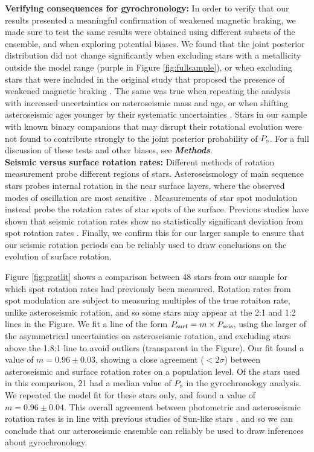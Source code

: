 \documentclass[12pt]{article}
\begin{document}
\textbf{Verifying consequences for gyrochronology:} In order to verify that our results presented a meaningful confirmation of weakened magnetic braking, we made sure to test the same results were obtained using different subsets of the ensemble, and when exploring potential biases. We found that the joint posterior distribution did not change significantly when excluding stars with a metallicity outside the model range (purple in Figure \ref{fig:fullsample}), or when excluding stars that were included in the original study that proposed the presence of weakened magnetic braking \cite{vansaders+2016}. The same was true when repeating the analysis with increased uncertainties on asteroseismic mass and age, or when shifting asteroseismic ages younger by their systematic uncertainties \cite{silvaaguirre+2015, silvaaguirre+2017}. Stars in our sample with known binary companions that may disrupt their rotational evolution were not found to contribute strongly to the joint posterior probability of $P_{\rm s}$. For a full discussion of these tests and other biases, see \textbf{\textit{Methods}}.\\

\textbf{Seismic versus surface rotation rates:} Different methods of rotation measurement probe different regions of stars. Asteroseismology of main sequence stars probes internal rotation in the near surface layers, where the observed modes of oscillation are most sensitive \cite{lund+2014}. Measurements of star spot modulation instead probe the rotation rates of star spots of the surface. Previous studies have shown that seismic rotation rates show no statistically significant deviation from spot rotation rates \cite{nielsen+2015, benomar+2015}. Finally, we confirm this for our larger sample to ensure that our seismic rotation periods can be reliably used to draw conclusions on the evolution of surface rotation.

Figure \ref{fig:protlit} shows a comparison between 48 stars from our sample for which spot  rotation rates had previously been measured. Rotation rates from spot modulation are subject to measuring multiples of the true rotaiton rate, unlike asteroseismic rotation, and so some stars may appear at the 2:1 and 1:2 lines in the Figure. We fit a line of the form $P_{\rm surf} = m \times P_{\rm seis}$, using the larger of the asymmetrical uncertainties on asteroseismic rotation, and excluding stars above the 1.8:1 line to avoid outliers (transparent in the Figure). Our fit found a value of $m = 0.96 \pm 0.03$, showing a close agreement ($<2\sigma$) between asteroseismic and surface rotation rates on a population level. Of the stars used in this comparison, 21 had a median value of $P_{\rm s}$ in the gyrochronology analysis. We repeated the model fit for these stars only, and found a value of $m = 0.96 \pm 0.04$.  This overall agreement between photometric and asteroseismic rotation rates is in line with previous studies of Sun-like stars \cite{gizon+2013, chaplin+2013, nielsen+2015, benomar+2015}, and so we can conclude that our asteroseismic ensemble can reliably be used to draw inferences about gyrochronology.\\
\end{document}
